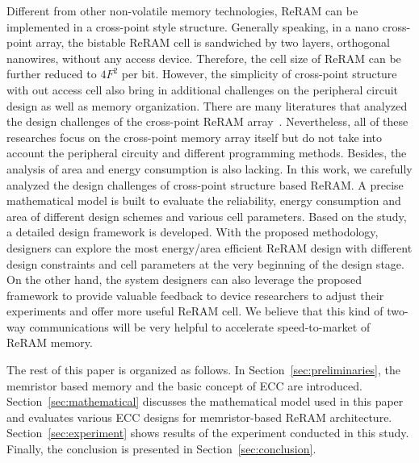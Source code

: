 Different from other non-volatile memory technologies, ReRAM can be implemented in a cross-point style structure. Generally speaking, in a nano cross-point array, the bistable ReRAM cell is sandwiched by two layers, orthogonal nanowires, without any access device. Therefore, the cell size of ReRAM can be further reduced to $4F^2$ per bit. However, the simplicity of cross-point structure with out access cell also bring in additional challenges on the peripheral circuit design as well as memory organization. There are many literatures that analyzed the design challenges of the cross-point ReRAM array~\cite{crossbar_NANO08_Flocke}\cite{crossbar_NANO2002_Ziegler}\cite{crossbar_NANO2003_Ziegler}\cite{crossbar_TED_2010}. Nevertheless, all of these researches focus on the cross-point memory array itself but do not take into account the peripheral circuity and different programming methods. Besides, the analysis of area and energy consumption is also lacking. In this work, we carefully analyzed the design challenges of cross-point structure based ReRAM. A precise mathematical model is built to evaluate the reliability, energy consumption and area of different design schemes and various cell parameters. Based on the study, a detailed design framework is developed. With the proposed methodology, designers can explore the most energy/area efficient ReRAM design with different design constraints and cell parameters at the very beginning of the design stage. On the other hand, the system designers can also leverage the proposed framework to provide valuable feedback to device researchers to adjust their experiments and offer more useful ReRAM cell. We believe that this kind of two-way communications will be very helpful to accelerate speed-to-market of ReRAM memory.

The rest of this paper is organized as follows. In
Section~\ref{sec:preliminaries}, the memristor based memory and the basic
concept of ECC are introduced. Section~\ref{sec:mathematical} discusses the mathematical model used in this paper and evaluates various ECC
designs for memristor-based ReRAM architecture. Section~\ref{sec:experiment} shows results of the experiment conducted in this study. Finally, the conclusion is presented in Section~\ref{sec:conclusion}.


